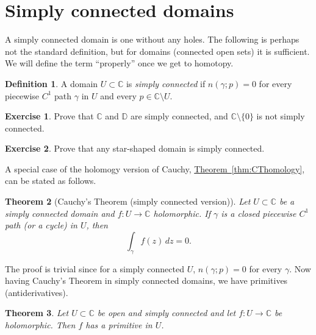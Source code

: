 \documentclass[12pt,openany]{book}
\newcommand{\C}{{\mathbb{C}}}
\newcommand{\D}{{\mathbb{D}}}
\newcommand{\myindex}[1]{#1\index{#1}}
\theoremstyle{plain}
\newtheorem{thm}{Theorem}[section]
\theoremstyle{remark}
\theoremstyle{definition}
\newtheorem{defn}[thm]{Definition}
\newenvironment{exbox}{%
    \def\FrameCommand{\vrule width 1pt \relax\hspace {10pt}}%
    \MakeFramed {\advance \hsize -\width \FrameRestore }%
}{%
    \endMakeFramed
}
\theoremstyle{exercise}
\newtheorem{exercise}{Exercise}[section]
\theoremstyle{example}
\newcommand{\thmref}[1]{\hyperref[#1]{Theorem~\ref*{#1}}}
\begin{document}

\section{Simply connected domains}

A simply connected domain is one without any holes.  The following is
perhaps not the standard definition, but for domains (connected open sets)
it is sufficient.  We will define the term ``properly'' once we get 
to homotopy.

\begin{defn} \label{defn:simplyconnected:homology}
A domain $U \subset \C$ is \emph{\myindex{simply connected}}
if $n(\gamma;p) = 0$ for every
piecewise $C^1$ path $\gamma$ in $U$ and every $p \in \C \setminus U$.
\end{defn}

\begin{exbox}
\begin{exercise}
Prove that $\C$ and $\D$ are simply connected, and $\C \setminus \{ 0 \}$
is not simply connected.
\end{exercise}

\begin{exercise}
Prove that any star-shaped domain is simply connected.
\end{exercise}
\end{exbox}

A special case of the holomogy version of Cauchy,
\thmref{thm:CThomology}, can be stated as follows.

\begin{thm}[Cauchy's Theorem (simply connected version)]
Let $U \subset \C$ be a simply connected domain and $f \colon U \to \C$
holomorphic.  If $\gamma$ is a
closed
piecewise $C^1$ path (or a cycle) in $U$, then
\begin{equation*}
\int_\gamma f(z) \, dz = 0 .
\end{equation*}
\end{thm}

The proof is trivial since for a simply connected $U$, $n(\gamma;p) = 0$
for every $\gamma$.  Now having Cauchy's Theorem in simply connected
domains, we have primitives (antiderivatives).

\begin{thm}
Let $U \subset \C$ be open and simply connected and
let $f \colon U \to \C$ be holomorphic.  Then $f$ has a
primitive in $U$.
\end{thm}
\end{document}
